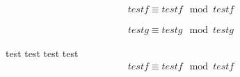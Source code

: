 
\begin{eqnarray*}
testf \equiv testf \mod testf
\end{eqnarray*}

\begin{eqnarray}
testg \equiv testg \mod testg
\end{eqnarray}

test test test test
\begin{eqnarray*}
testf \equiv testf \mod testf
\end{eqnarray*}
